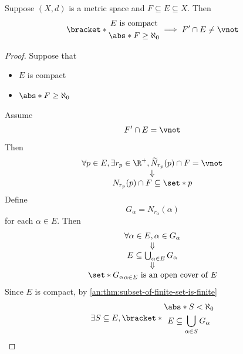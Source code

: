\bigskip

\begin{theorem} \label{an:thm:infinite-subset-of-compact-set-has-limit-point}
  Suppose $(X, d)$ is a metric space and $F \subseteq E \subseteq X$. Then
  \[
    \bracket*{\begin{gathered}
        E \text{ is compact} \\
        \abs*{F} \geq \aleph_{0}
      \end{gathered}} \implies F' \cap E \neq \vnot
  \]
\end{theorem}

\begin{proof}
  Suppose that
  \begin{itemize}
    \item $E$ is compact
    \item $\abs*{F} \geq \aleph_{0}$
  \end{itemize}
  Assume
  \[
    F' \cap E = \vnot
  \]
  Then
  \[
    \begin{array}{c}
      \forall p \in E, \exists r_{p} \in \R^{+}, \widetilde{N}_{r_{p}}(p) \cap F = \vnot \\
      \Downarrow                                                                         \\
      N_{r_{p}}(p) \cap F \subseteq \set*{p}
    \end{array}
  \]
  Define
  \[
    G_{\alpha} = N_{r_{\alpha}}(\alpha)
  \]
  for each $\alpha \in E$. Then
  \[
    \begin{array}{c}
      \forall \alpha \in E, \alpha \in G_{\alpha}   \\
      \Downarrow                                    \\
      E \subseteq \bigcup_{\alpha \in E} G_{\alpha} \\
      \Downarrow                                    \\
      \set*{G_{\alpha}}_{\alpha \in E} \text{ is an open cover of } E
    \end{array}
  \]
  Since $E$ is compact, by \cref{an:thm:subset-of-finite-set-is-finite}
  \[
    \begin{array}{c}
      \exists S \subseteq E,
      \bracket*{\begin{gathered}
          \abs*{S} < \aleph_{0} \\
          E \subseteq \bigcup_{\alpha \in S} G_{\alpha}
        \end{gathered}}                              \\

\end{array}\]
\end{proof}
